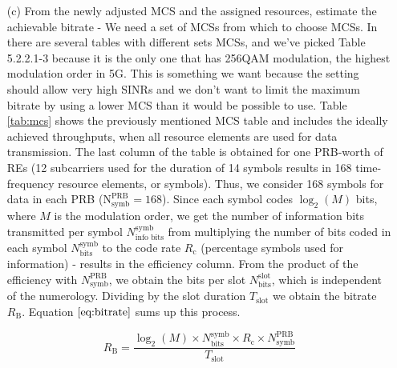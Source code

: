 \begin{itemize}
\begin{itemize}
        \item[(c)] From the newly adjusted MCS and the assigned resources, estimate the achievable bitrate - 
        We need a set of MCSs from which to choose MCSs. In \cite{3gpp-codebooks} there are several tables with different sets MCSs, and we've picked Table 5.2.2.1-3 because it is the only one that has 256QAM modulation, the highest modulation order in 5G. This is something we want because the setting should allow very high SINRs and we don't want to limit the maximum bitrate by using a lower MCS than it would be possible to use. Table \ref{tab:mcs} shows the previously mentioned MCS table and includes the ideally achieved throughputs, when all resource elements are used for data transmission. The last column of the table is obtained for one PRB-worth of \acsp{RE} (12 subcarriers used for the duration of 14 symbols results in 168 time-frequency resource elements, or symbols). Thus, we consider 168 symbols for data in each PRB ($\text{N}_\text{symb}^\text{PRB} = 168$). Since each symbol codes $\log_2(M)$ bits, where $M$ is the modulation order, we get the number of information bits transmitted per symbol $N_\text{info bits}^\text{symb}$ from multiplying the number of bits coded in each symbol $N_\text{bits}^\text{symb}$ to the code rate $R_\text{c}$ (percentage symbols used for information) - results in the efficiency column. From the product of the efficiency with $N_\text{symb}^\text{PRB}$, we obtain the bits per slot $N_\text{bits}^\text{slot}$, which is independent of the numerology. Dividing by the slot duration $T_\text{slot}$ we obtain the bitrate $R_\text{B}$. Equation $\eqref{eq:bitrate}$ sums up this process.

        \begin{equation} \label{eq:bitrate}
            R_\text{B} = \frac{\log_2(M) \times N_\text{bits}^\text{symb} \times R_\text{c} \times N_\text{symb}^\text{PRB}}{T_\text{slot}}
        \end{equation}


\end{itemize}
\end{itemize}
